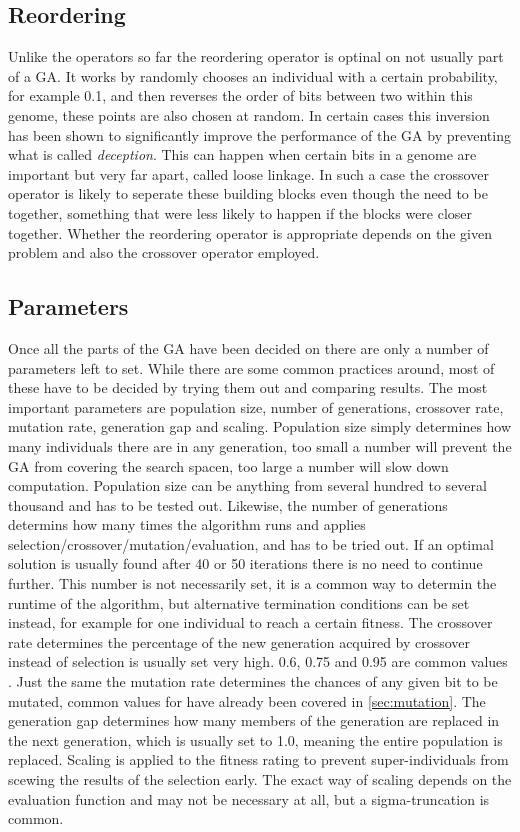 \subsection{Reordering}
\label{sec:reordering}

Unlike the operators so far the reordering operator is optinal on not usually part of a GA. It works by randomly chooses an individual with a certain probability, for example 0.1, and then reverses the order of bits between two within this genome, these points are also chosen at random. In certain cases this inversion has been shown to significantly improve the performance of the GA by preventing what is called \textit{deception}\cite{8}. This can happen when certain bits in a genome are important but very far apart, called loose linkage. In such a case the crossover operator is likely to seperate these building blocks even though the need to be together, something that were less likely to happen if the blocks were closer together. Whether the reordering operator is appropriate depends on the given problem and also the crossover operator employed.

\subsection{Parameters}
\label{sec:parameters}

Once all the parts of the GA have been decided on there are only a number of parameters left to set. While there are some common practices around, most of these have to be decided by trying them out and comparing results. The most important parameters are population size, number of generations, crossover rate, mutation rate, generation gap and scaling. Population size simply determines how many individuals there are in any generation, too small a number will prevent the GA from covering the search spacen, too large a number will slow down computation. Population size can be anything from several hundred to several thousand and has to be tested out. Likewise, the number of generations determins how many times the algorithm runs and applies selection/crossover/mutation/evaluation, and has to be tried out. If an optimal solution is usually found after 40 or 50 iterations there is no need to continue further. This number is not necessarily set, it is a common way to determin the runtime of the algorithm, but alternative termination conditions can be set instead, for example for one individual to reach a certain fitness. The crossover rate determines the percentage of the new generation acquired by crossover instead of selection is usually set very high. 0.6, 0.75 and 0.95 are common values \cite{20, 22,24}. Just the same the mutation rate determines the chances of any given bit to be mutated, common values for have already been covered in \ref{sec:mutation}. The generation gap determines how many members of the generation are replaced in the next generation, which is usually set to 1.0, meaning the entire population is replaced. Scaling is applied to the fitness rating to prevent super-individuals from scewing the results of the selection early. The exact way of scaling depends on the evaluation function and may not be necessary at all, but a sigma-truncation is common. \cite{26}

